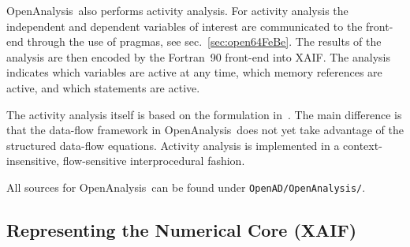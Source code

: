 \documentclass{book}
\newcommand{\OpenAnalysis}{OpenAnalysis}
\newcommand{\xaif}{XAIF}
\newcommand{\refsec}[1]{{sec.~\ref{#1}}}
\begin{document}
\OpenAnalysis\ also performs activity analysis.  For activity analysis
the independent and dependent variables of interest are communicated
to the front-end through the use of pragmas, see \refsec{sec:open64FeBe}.
The results of the analysis are then encoded by the Fortran~90
front-end into \xaif.  The analysis indicates which variables are
active at any time, which memory references are active, and which
statements are active.

The activity analysis itself is based on the formulation in~\cite{Hascoet2005bra}.
The main difference is that the data-flow framework in \OpenAnalysis\ does not
yet take advantage of the structured data-flow equations.  Activity analysis is
implemented in a context-insensitive, flow-sensitive interprocedural fashion.

All sources for \OpenAnalysis\ can be found under \lstinline{OpenAD/OpenAnalysis/}.

\subsection{Representing the Numerical Core (\xaif)} \label{sec:xaif}
\end{document}
